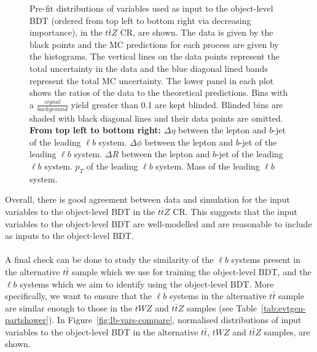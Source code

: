 \begin{figure}[htbp]
\caption{Pre-fit distributions of variables used as input to the object-level BDT (ordered from top left to bottom right via decreasing importance), in the $t\bar{t}Z$ CR, are shown. The data is given by the black points and the MC predictions for each process are given by the histograms. The vertical lines on the data points represent the total uncertainty in the data and the blue diagonal lined bands represent the total MC uncertainty. The lower panel in each plot shows the ratios of the data to the theoretical predictions. Bins with a $\frac{signal}{background}$ yield greater than 0.1 are kept blinded. Blinded bins are shaded with black diagonal lines and their data points are omitted. \textbf{From top left to bottom right:} $\Delta \eta$ between the lepton and $b$-jet of the leading $\ell b$ system. $\Delta \phi$ between the lepton and $b$-jet of the leading $\ell b$ system. $\Delta R$ between the lepton and $b$-jet of the leading $\ell b$ system. $p_{T}$ of the leading $\ell b$ system. Mass of the leading $\ell b$ system.}
  \label{fig:4lep-ttZCR-objectbdt-vars}
\end{figure}

Overall, there is good agreement between data and simulation for the input variables to the object-level BDT in the $t\bar{t}Z$ CR. This suggests that the input variables to the object-level BDT are well-modelled and are reasonable to include as inputs to the object-level BDT. \\\\
A final check can be done to study the similarity of the $\ell b$ systems present in the alternative $t\bar{t}$ sample which we use for training the object-level BDT, and the $\ell b$ systems which we aim to identify using the object-level BDT. More specifically, we want to ensure that the $\ell b$ systems in the alternative $t\bar{t}$ sample are similar enough to those in the $tWZ$ and $t\bar{t}Z$ samples (see Table~\ref{tab:evtgen-partshower}). In Figure~\ref{fig:lb-vars-compare}, normalised distributions of input variables to the object-level BDT in the alternative $t\bar{t}$, $tWZ$ and $t\bar{t}Z$ samples, are shown.


